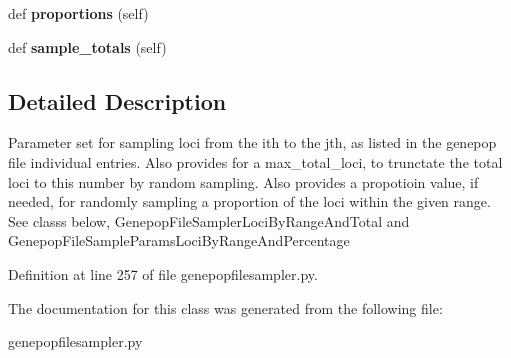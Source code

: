 \begin{DoxyCompactItemize}
\item 
def {\bfseries proportions} (self)\hypertarget{classnegui_1_1genepopfilesampler_1_1GenepopFileSampleParamsLoci_ab34f0100656df6bb9e6c7c02d72b9a71}{}\label{classnegui_1_1genepopfilesampler_1_1GenepopFileSampleParamsLoci_ab34f0100656df6bb9e6c7c02d72b9a71}

\item 
def {\bfseries sample\+\_\+totals} (self)\hypertarget{classnegui_1_1genepopfilesampler_1_1GenepopFileSampleParamsLoci_a28de868054462f16d6ed84944ce248b1}{}\label{classnegui_1_1genepopfilesampler_1_1GenepopFileSampleParamsLoci_a28de868054462f16d6ed84944ce248b1}

\end{DoxyCompactItemize}


\subsection{Detailed Description}
\begin{DoxyVerb}Parameter set for sampling loci from the ith to the jth, 
as listed in the genepop file individual entries. 
Also provides for a max_total_loci, to trunctate the total loci 
to this number by random sampling. Also provides a propotioin value,
if needed, for randomly sampling a proportion of the loci within
the given range.  See classs below, GenepopFileSamplerLociByRangeAndTotal and
GenepopFileSampleParamsLociByRangeAndPercentage
\end{DoxyVerb}
 

Definition at line 257 of file genepopfilesampler.\+py.



The documentation for this class was generated from the following file\+:\begin{DoxyCompactItemize}
\item 
genepopfilesampler.\+py\end{DoxyCompactItemize}
